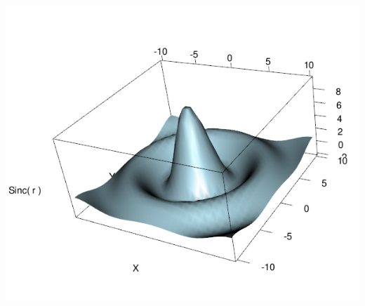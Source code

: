 \begin{frame}
\begin{columns}[t]
\begin{column}{.6\textwidth}
{{          \includegraphics[scale=0.3]{images/preview_rgl}}}  
\end{column}
\end{columns}
\end{frame}

